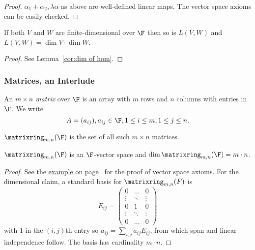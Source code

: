 \documentclass[a4paper]{article}
\newcommand*{\M}{\matrixring}
\theoremstyle{definition}
\begin{document}
\begin{proof}
  \(\alpha_1+\alpha_2, \lambda\alpha\) as above are well-defined linear maps. The vector space axioms can be easily checked.
\end{proof}

\begin{proposition}
  \label{prop:dimension of linear map space}
  If both \(V\) and \(W\) are finite-dimensional over \(\F\) then so is \(L(V,W)\) and \(L(V,W) = \dim V \cdot \dim W\).
\end{proposition}

\begin{proof}
  See Lemma~\ref{cor:dim of hom}.
\end{proof}

\subsubsection{Matrices, an Interlude}

\begin{definition}[Matrix]
  An \emph{\(m\times n\) matrix} over \(\F\) is an array with \(m\) rows and \(n\) columns with entries in \(\F\). We write
  \[
A = (a_{ij}), a_{ij}\in\F, 1\leq i \leq m, 1\leq j \leq n.
  \]
\end{definition}

\begin{definition}
  \(\M_{m,n}(\F)\) is the set of all such \(m\times n\) matrices.
\end{definition}

\begin{proposition}
  \(\M_{m,n}(\F)\) is an \(\F\)-vector space and \(\dim \M_{m,n}(\F) = m\cdot n\).
\end{proposition}

\begin{proof}
  See the \hyperref[eg:matrix as V]{example} on page~\pageref{eg:matrix as V} for the proof of vector space axioms. For the dimensional claim, a standard basis for \(\M_{m,n}(F)\) is
  \[
    E_{ij}=
    \begin{pmatrix}
      0 & \dots & 0 \\
      \vdots & \ddots & \vdots \\
      0 & 1 & 0 \\
      \vdots & \ddots & \vdots \\
      0 & \dots & 0 
    \end{pmatrix}
  \]
  with \(1\) in the \((i,j)\)th entry so \(a_{ij} = \sum_{i,j}^{} a_{ij}E_{ij}\), from which span and linear independence follow. The basis has cardinality \(m\cdot n\).
\end{proof}
\end{document}
